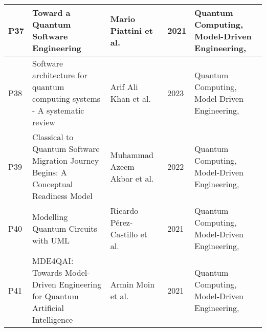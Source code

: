 \begin{longtable}{|m{0.8cm}|m{4.4cm}|m{3cm}|m{0.8cm}|m{4cm}|}
    P37 & Toward a Quantum Software Engineering & Mario Piattini et al.~\cite{Piattini_2021} & 2021 & Quantum Computing, Model-Driven Engineering,  \\ \hline
    P38 & Software architecture for quantum computing systems - A systematic review & Arif Ali Khan et al.~\cite{khan2023software} & 2023 & Quantum Computing, Model-Driven Engineering,  \\ \hline
    P39 & Classical to Quantum Software Migration Journey Begins: A Conceptual Readiness Model & Muhammad Azeem Akbar et al.~\cite{Akbar_2022} & 2022 & Quantum Computing, Model-Driven Engineering,  \\ \hline
    P40 & Modelling Quantum Circuits with UML & Ricardo Pérez‐Castillo et al.~\cite{Perez-Castillo_2021} & 2021 & Quantum Computing, Model-Driven Engineering,  \\ \hline
    P41 & MDE4QAI: Towards Model-Driven Engineering for Quantum Artificial Intelligence & Armin Moin et al.~\cite{Moin_2021} & 2021 & Quantum Computing, Model-Driven Engineering,  \\ \hline
\end{longtable}

